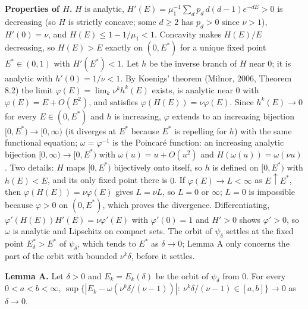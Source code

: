 \documentclass{nws}
\begin{document}
\textbf{Properties of $H$.} $H$ is analytic, $H'(E)=\mu_1^{-1}\sum_dp_d\,d(d-1)e^{-dE}>0$ is
decreasing (so $H$ is strictly concave; some $d\ge2$ has $p_d>0$ since $\nu>1$),
$H'(0)=\nu$, and $H(E)\le1-1/\mu_1<1$. Concavity makes $H(E)/E$ decreasing, so
$H(E)>E$ exactly on $(0,E^*)$ for a unique fixed point $E^*\in(0,1)$ with
$H'(E^*)<1$. Let $h$ be the inverse branch of $H$ near $0$; it is analytic with
$h'(0)=1/\nu<1$. By Koenigs' theorem (Milnor, 2006, Theorem 8.2) the limit
$\varphi(E)=\lim_k\nu^kh^k(E)$ exists, is analytic near $0$ with $\varphi(E)=E+O(E^2)$,
and satisfies $\varphi(H(E))=\nu\varphi(E)$. Since $h^k(E)\to0$ for every
$E\in(0,E^*)$ and $h$ is increasing, $\varphi$ extends to an increasing bijection
$[0,E^*)\to[0,\infty)$ (it diverges at $E^*$ because $E^*$ is repelling for $h$) with
the same functional equation; $\omega=\varphi^{-1}$ is the Poincar\'e function: an increasing analytic bijection $[0,\infty)\to[0,E^*)$ with $\omega(u)=u+O(u^2)$ and $H(\omega(u))=\omega(\nu u)$. Two details: $H$ maps $[0,E^*)$ bijectively onto itself, so $h$ is defined on $[0,E^*)$ with $h(E)<E$, and its only fixed point there is $0$. If $\varphi(E)\to L<\infty$ as $E\uparrow E^*$, then $\varphi(H(E))=\nu\varphi(E)$ gives $L=\nu L$, so $L=0$ or $\infty$; $L=0$ is impossible because $\varphi>0$ on $(0,E^*)$, which proves the divergence. Differentiating, $\varphi'(H(E))H'(E)=\nu\varphi'(E)$ with $\varphi'(0)=1$ and $H'>0$ shows $\varphi'>0$, so $\omega$ is analytic and Lipschitz on compact sets. The orbit of $\psi_\delta$ settles at the fixed point $E^*_\delta>E^*$ of $\psi_\delta$, which tends to $E^*$ as $\delta\to0$; Lemma A only concerns the part of the orbit with bounded $\nu^k\delta$, before it settles.

\textbf{Lemma A.} Let $\delta>0$ and $E_k=E_k(\delta)$ be the orbit of $\psi_\delta$ from $0$.
For every $0<a<b<\infty$,
$\sup\{|E_k-\omega(\nu^k\delta/(\nu-1))|:\ \nu^k\delta/(\nu-1)\in[a,b]\}\to0$ as $\delta\to0$.
\end{document}
